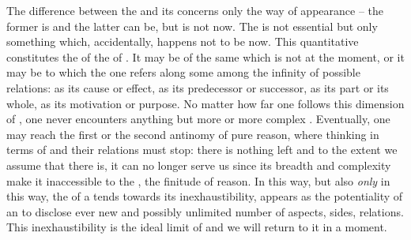 The difference between the  and its  concerns only the way
of appearance -- the former is  and the latter can be, but is not
now.  The  is not essential  but only something
which, accidentally, happens not to be  now.  This quantitative
 constitutes the  of the  of
.  It may be  of the same  which is not
 at the moment, or it may be   to which the
 one refers along some among the infinity of possible relations: as
its cause or effect, as its predecessor or successor, as its part or its whole,
as its motivation or purpose.  No matter how far one follows this dimension of
, one never encounters anything but more  or
more complex .  Eventually, one may reach the first or the second
antinomy of pure reason, where thinking in terms of  and their
relations must stop: there is nothing  left and to the extent we assume
that there is, it can no longer serve us since its breadth and complexity make
it inaccessible to the , the finitude of reason.
%
In this way, but also {\em only} in this way, the  of a 
tends towards its inexhaustibility, appears as the potentiality of an
 to disclose ever new and possibly unlimited number of
aspects, sides, relations. This inexhaustibility is the ideal limit of 
and we will return to it in a moment. 


